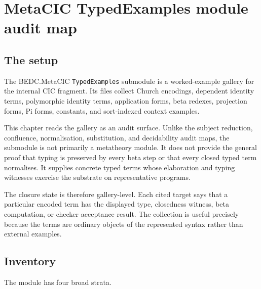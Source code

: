 \chapter{MetaCIC TypedExamples module audit map}
\label{ch:metacic-typedexamples-audit-map}

\section{The setup}
\label{sec:metacic-typedexamples-audit-map-setup}

The BEDC.MetaCIC \texttt{TypedExamples} submodule is a worked-example gallery
for the internal CIC fragment. Its files collect Church encodings, dependent
identity terms, polymorphic identity terms, application forms, beta redexes,
projection forms, Pi forms, constants, and sort-indexed context examples.

This chapter reads the gallery as an audit surface. Unlike the subject
reduction, confluence, normalisation, substitution, and decidability audit maps,
the submodule is not primarily a metatheory module. It does not provide the
general proof that typing is preserved by every beta step or that every closed
typed term normalises. It supplies concrete typed terms whose elaboration and
typing witnesses exercise the substrate on representative programs.

The closure state is therefore gallery-level. Each cited target says that a
particular encoded term has the displayed type, closedness witness, beta
computation, or checker acceptance result. The collection is useful precisely
because the terms are ordinary objects of the represented syntax rather than
external examples.

\section{Inventory}
\label{sec:metacic-typedexamples-audit-map-inventory}

The module has four broad strata.


